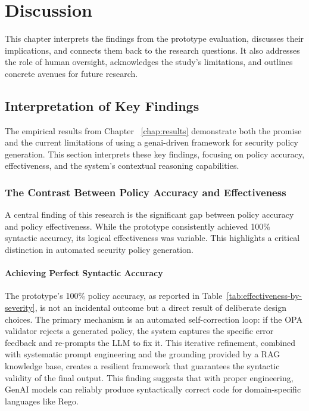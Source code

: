 
\chapter{Discussion}
\label{chap:discussion}

This chapter interprets the findings from the prototype evaluation, discusses their implications, and connects them back to the research questions. It also addresses the role of human oversight, acknowledges the study's limitations, and outlines concrete avenues for future research.

\section{Interpretation of Key Findings}
\label{sec:interpretation}

The empirical results from Chapter~
\ref{chap:results} demonstrate both the promise and the current limitations of using a \gls{genai}-driven framework for security policy generation. This section interprets these key findings, focusing on policy accuracy, effectiveness, and the system's contextual reasoning capabilities.

\subsection{The Contrast Between Policy Accuracy and Effectiveness}
A central finding of this research is the significant gap between policy accuracy and policy effectiveness. While the prototype consistently achieved 100\% syntactic accuracy, its logical effectiveness was variable. This highlights a critical distinction in automated security policy generation.

\subsubsection{Achieving Perfect Syntactic Accuracy}
The prototype's 100\% policy accuracy, as reported in Table~\ref{tab:effectiveness-by-severity}, is not an incidental outcome but a direct result of deliberate design choices. The primary mechanism is an automated self-correction loop: if the OPA validator rejects a generated policy, the system captures the specific error feedback and re-prompts the LLM to fix it. This iterative refinement, combined with systematic prompt engineering and the grounding provided by a RAG knowledge base, creates a resilient framework that guarantees the syntactic validity of the final output. This finding suggests that with proper engineering, GenAI models can reliably produce syntactically correct code for domain-specific languages like Rego.

